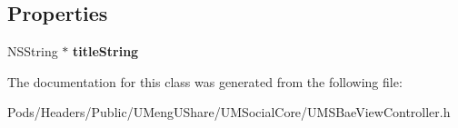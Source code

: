 \subsection*{Properties}
\begin{DoxyCompactItemize}
\item 
\mbox{\label{interface_u_m_s_bae_view_controller_a5e34560218c5590783b79a4a6c777846}} 
N\+S\+String $\ast$ {\bfseries title\+String}
\end{DoxyCompactItemize}


The documentation for this class was generated from the following file\+:\begin{DoxyCompactItemize}
\item 
Pods/\+Headers/\+Public/\+U\+Meng\+U\+Share/\+U\+M\+Social\+Core/U\+M\+S\+Bae\+View\+Controller.\+h\end{DoxyCompactItemize}

